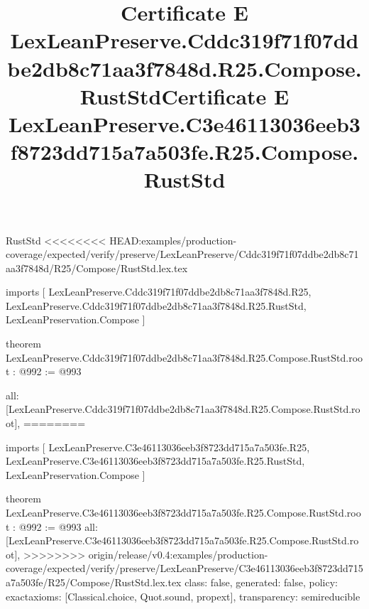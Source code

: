 \begin{lexlean}{RustStd}
<<<<<<<< HEAD:examples/production-coverage/expected/verify/preserve/LexLeanPreserve/Cddc319f71f07ddbe2db8c71aa3f7848d/R25/Compose/RustStd.lex.tex
\title{Certificate E LexLeanPreserve.Cddc319f71f07ddbe2db8c71aa3f7848d.R25.Compose.RustStd}
\begin{coremodule}
imports [
  LexLeanPreserve.Cddc319f71f07ddbe2db8c71aa3f7848d.R25,
  LexLeanPreserve.Cddc319f71f07ddbe2db8c71aa3f7848d.R25.RustStd,
  LexLeanPreservation.Compose
]

theorem LexLeanPreserve.Cddc319f71f07ddbe2db8c71aa3f7848d.R25.Compose.RustStd.root : @992 := @993 {
  all: [LexLeanPreserve.Cddc319f71f07ddbe2db8c71aa3f7848d.R25.Compose.RustStd.root],
========
\title{Certificate E LexLeanPreserve.C3e46113036eeb3f8723dd715a7a503fe.R25.Compose.RustStd}
\begin{coremodule}
imports [
  LexLeanPreserve.C3e46113036eeb3f8723dd715a7a503fe.R25,
  LexLeanPreserve.C3e46113036eeb3f8723dd715a7a503fe.R25.RustStd,
  LexLeanPreservation.Compose
]

theorem LexLeanPreserve.C3e46113036eeb3f8723dd715a7a503fe.R25.Compose.RustStd.root : @992 := @993 {
  all: [LexLeanPreserve.C3e46113036eeb3f8723dd715a7a503fe.R25.Compose.RustStd.root],
>>>>>>>> origin/release/v0.4:examples/production-coverage/expected/verify/preserve/LexLeanPreserve/C3e46113036eeb3f8723dd715a7a503fe/R25/Compose/RustStd.lex.tex
  class: false,
  generated: false,
  policy: exact{axioms: [Classical.choice, Quot.sound, propext]},
  transparency: semireducible
}


\end{coremodule}}
\end{coremodule}
\end{lexlean}
